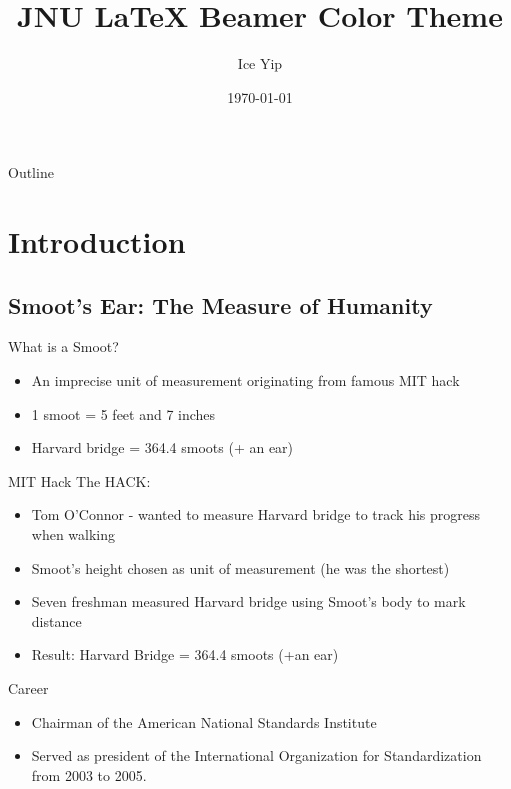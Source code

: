 \documentclass{beamer}
\title{JNU LaTeX Beamer Color Theme}
\author{Ice Yip}
\date{\today}
\begin{document}

\frame{\titlepage}

\section[Outline]{}
\begin{frame}{Outline}
  \tableofcontents
\end{frame}

\section{Introduction}
\subsection{Smoot's Ear: The Measure of Humanity}
\begin{frame}{What is a Smoot?}
  \begin{itemize}
    \item An imprecise unit of measurement originating from famous MIT hack
    \item 1 smoot = 5 feet and 7 inches
    \item Harvard bridge = 364.4 smoots (+ an ear)
  \end{itemize}
\end{frame}
\begin{frame}{MIT Hack}
  The HACK:
  \pause
  \begin{itemize}
    \item<2-> Tom O'Connor - wanted to measure Harvard bridge to track his progress when walking
    \item<3-> Smoot's height chosen as unit of measurement (he was the shortest)
    \item<4-> Seven freshman measured Harvard bridge using Smoot's body to mark distance
    \item<5-> Result: Harvard Bridge = 364.4 smoots (+an ear)
  \end{itemize}
\end{frame}
\begin{frame}{Career}
  \begin{itemize}
    \item<1-> Chairman of the American National Standards Institute 
    \item<2-> Served as president of the International Organization for Standardization from 2003 to 2005.
  \end{itemize}
\end{frame}
\end{document}
